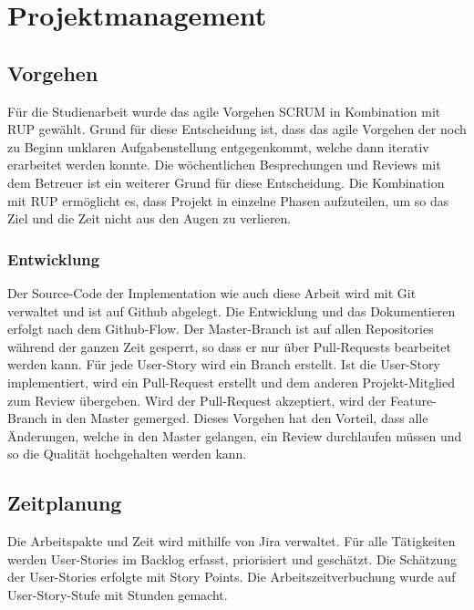 
\section{Projektmanagement}
\label{sec:Projektmanagement}

\subsection{Vorgehen}
\label{sub:Vorgehen}

Für die Studienarbeit wurde das agile Vorgehen SCRUM in Kombination mit \ac{RUP} gewählt. Grund für diese Entscheidung ist, dass das agile Vorgehen der noch zu Beginn unklaren Aufgabenstellung entgegenkommt, welche dann iterativ erarbeitet werden konnte. Die wöchentlichen Besprechungen und Reviews mit dem Betreuer ist ein weiterer Grund für diese Entscheidung. Die Kombination mit \ac{RUP} ermöglicht es, dass Projekt in einzelne Phasen aufzuteilen, um so das Ziel und die Zeit nicht aus den Augen zu verlieren.

\subsubsection{Entwicklung}
\label{sub:Entwicklung}

Der Source-Code der Implementation wie auch diese Arbeit wird mit Git verwaltet und ist auf Github abgelegt. Die Entwicklung und das Dokumentieren erfolgt nach dem Github-Flow. Der Master-Branch ist auf allen Repositories während der ganzen Zeit gesperrt, so dass er nur über Pull-Requests bearbeitet werden kann. Für jede User-Story wird ein Branch erstellt. Ist die User-Story implementiert, wird ein Pull-Request erstellt und dem anderen Projekt-Mitglied zum Review übergeben. Wird der Pull-Request akzeptiert, wird der Feature-Branch in den Master gemerged. Dieses Vorgehen hat den Vorteil, dass alle Änderungen, welche in den Master gelangen, ein Review durchlaufen müssen und so die Qualität hochgehalten werden kann.


\subsection{Zeitplanung}
\label{sub:Zeitplanung}

Die Arbeitspakte und Zeit wird mithilfe von Jira verwaltet. Für alle Tätigkeiten werden User-Stories im Backlog erfasst, priorisiert und geschätzt. Die Schätzung der User-Stories erfolgte mit Story Points. Die Arbeitszeitverbuchung wurde auf User-Story-Stufe mit Stunden gemacht.

